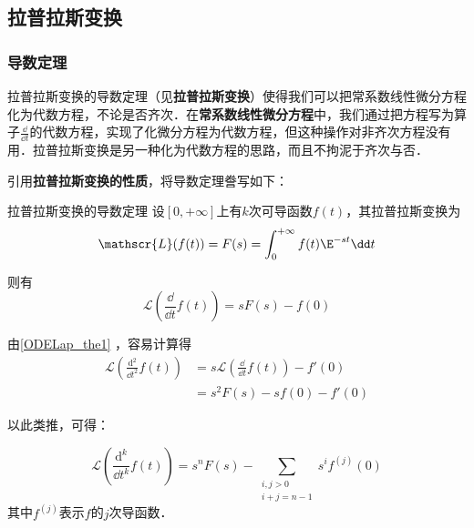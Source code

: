 

\subsection{拉普拉斯变换}

\subsubsection{导数定理}

拉普拉斯变换的导数定理（见\textbf{拉普拉斯变换}）使得我们可以把常系数线性微分方程化为代数方程，不论是否齐次．在\textbf{常系数线性微分方程}中，我们通过把方程写为算子$\frac{\dd }{\dd t}$的代数方程，实现了化微分方程为代数方程，但这种操作对非齐次方程没有用．拉普拉斯变换是另一种化为代数方程的思路，而且不拘泥于齐次与否．

引用\textbf{拉普拉斯变换的性质}，将导数定理誊写如下：
\begin{theorem}{拉普拉斯变换的导数定理}\label{ODELap_the1}
设$[0, +\infty]$上有$k$次可导函数$f(t)$，其拉普拉斯变换为
\begin{equation}
\mathscr{L}(f(t))=F(s)=\int^{+\infty}_0f(t)\E^{-st}\dd t
\end{equation}

则有
\begin{equation}
\mathscr{L}(\frac{\dd}{\dd t}f(t))=sF(s)-f(0)
\end{equation}
\end{theorem}

由\autoref{ODELap_the1} ，容易计算得
\begin{equation}
\begin{aligned}
\mathscr{L}(\frac{\mathrm{d}^2}{\dd t^2}f(t))&=s\mathscr{L}(\frac{\dd}{\dd t}f(t))-f'(0)\\
&=s^2F(s)-sf(0)-f'(0)
\end{aligned}
\end{equation}

以此类推，可得：

\begin{corollary}{}
\begin{equation}
\mathscr{L}(\frac{\mathrm{d}^k}{\dd t^k}f(t))=s^nF(s)-\sum_{\substack{i, j>0\\   i+j=n-1}}s^if^{(j)}(0)
\end{equation}
其中$f^{(j)}$表示$f$的$j$次导函数．



\end{corollary}




